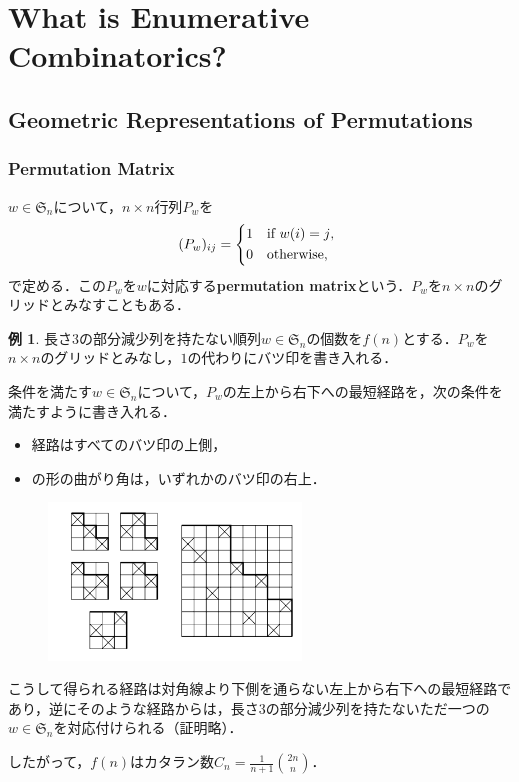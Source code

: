 \documentclass[xelatex,ja=standard,a4paper,14pt,everyparhook=compat]{bxjsarticle}
\newcommand{\fS}{\mathfrak{S}}
\theoremstyle{definition}
\newtheorem{example}[theorem]{例}
\begin{document}
\section{What is Enumerative Combinatorics?}
\setcounter{subsection}{4}
\subsection{Geometric Representations of Permutations}

\subsubsection{Permutation Matrix}

$w \in \fS_n$について，$n \times n$行列$P_w$を \begin{equation*}
    (P_w)_{ij} = \begin{cases*}
        1 & if $w(i) = j$, \\
        0 & otherwise,
    \end{cases*}
\end{equation*}
で定める．この$P_w$を$w$に対応する\textbf{permutation matrix}という．$P_w$を$n \times n$のグリッドとみなすこともある．

\begin{example}
    長さ$3$の部分減少列を持たない順列$w \in \fS_n$の個数を$f(n)$とする．$P_w$を$n \times n$のグリッドとみなし，$1$の代わりにバツ印を書き入れる．

    条件を満たす$w \in \fS_n$について，$P_w$の左上から右下への最短経路を，次の条件を満たすように書き入れる． \begin{itemize}
        \item 経路はすべてのバツ印の上側，
        \item \textlnot の形の曲がり角は，いずれかのバツ印の右上．
    \end{itemize}

    \begin{figure}[h]
        \centering
        \includegraphics[width=0.6\textwidth]{fig1.4.png}
    \end{figure}

    \newpage

    こうして得られる経路は対角線より下側を通らない左上から右下への最短経路であり，逆にそのような経路からは，長さ$3$の部分減少列を持たないただ一つの$w \in \fS_n$を対応付けられる（証明略）．

    したがって，$f(n)$はカタラン数$C_n = \frac{1}{n+1} \binom{2n}{n}$．
\end{example}
\end{document}
